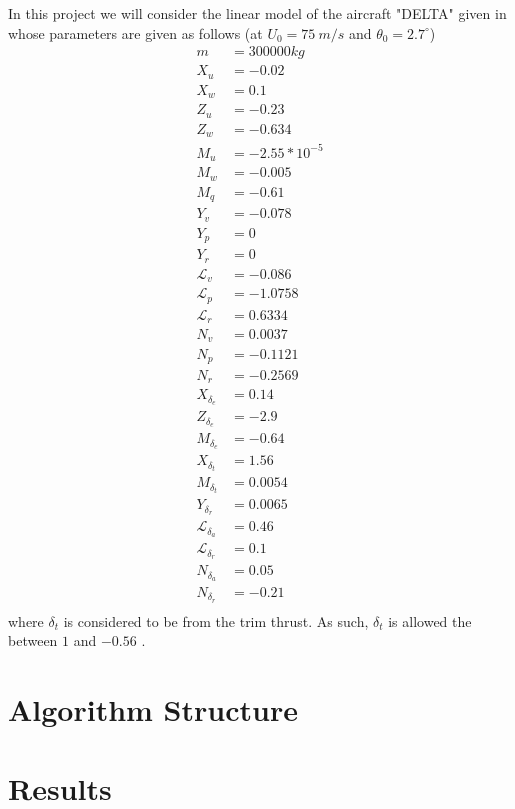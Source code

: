\documentclass{article}
\begin{document}
In this project we will consider the linear model of the aircraft "DELTA" given in \cite[PP. 561--563]{Mclean}
whose parameters are given as follows (at $U_0 = 75~ m/s$ and $\theta_0 = 2.7 ^\circ$)
\begin{equation}\label{Eq:DELTA_Params}
    \begin{split}
        m &= 300000 kg\\
        X_u &= -0.02\\
        X_w &= 0.1\\
        Z_u &= -0.23\\
        Z_w &= -0.634\\
        M_u &= -2.55*10^{-5}\\
        M_w &= -0.005\\
        M_q &= -0.61\\
        Y_v &= -0.078\\
        Y_p &= 0\\
        Y_r &= 0\\
        \mathcal{L}_v &= -0.086\\
        \mathcal{L}_p &= -1.0758\\
        \mathcal{L}_r &= 0.6334\\
        N_v &= 0.0037\\
        N_p &= -0.1121\\
        N_r &= -0.2569\\
        X_{\delta_e} &= 0.14\\
        Z_{\delta_e} &= -2.9\\
        M_{\delta_e} &= -0.64\\
        X_{\delta_t} &= 1.56\\
        M_{\delta_t} &= 0.0054\\
        Y_{\delta_r} &= 0.0065\\
        \mathcal{L}_{\delta_a} &= 0.46\\
        \mathcal{L}_{\delta_r} &= 0.1\\
        N_{\delta_a} &= 0.05\\
        N_{\delta_r} &= -0.21\\
    \end{split}
\end{equation}
where $\delta_t$ is considered to be from the trim thrust. 
As such, $\delta_t$ is allowed the between $1$ and $-0.56$ \cite{Hassan2016_JAST}.

\section{Algorithm Structure}


\section{Results}



\end{document}

